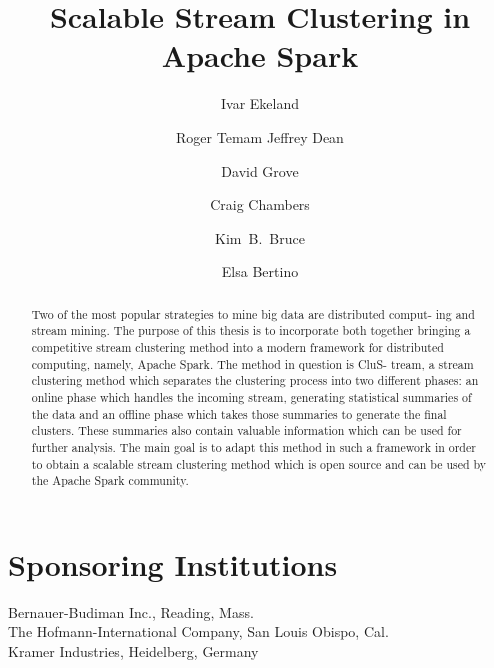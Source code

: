 \documentclass{llncs}
\begin{document}
\section*{Sponsoring Institutions}
%
Bernauer-Budiman Inc., Reading, Mass.\\
The Hofmann-International Company, San Louis Obispo, Cal.\\
Kramer Industries, Heidelberg, Germany
%
\tableofcontents
%
\mainmatter              %
%
\title{Scalable Stream Clustering in Apache Spark}
%
%
\author{Ivar Ekeland \and Roger Temam
Jeffrey Dean \and David Grove \and Craig Chambers \and Kim~B.~Bruce \and
Elsa Bertino}
%
%
%

\maketitle              %

\begin{abstract}
Two of the most popular strategies to mine big data are distributed comput-
ing and stream mining. The purpose of this thesis is to incorporate both together
bringing a competitive stream clustering method into a modern framework for
distributed computing, namely, Apache Spark. The method in question is CluS-
tream, a stream clustering method which separates the clustering process into two
different phases: an online phase which handles the incoming stream, generating
statistical summaries of the data and an offline phase which takes those summaries
to generate the final clusters. These summaries also contain valuable information
which can be used for further analysis. The main goal is to adapt this method in
such a framework in order to obtain a scalable stream clustering method which is
open source and can be used by the Apache Spark community.
\end{abstract}
%
\end{document}
